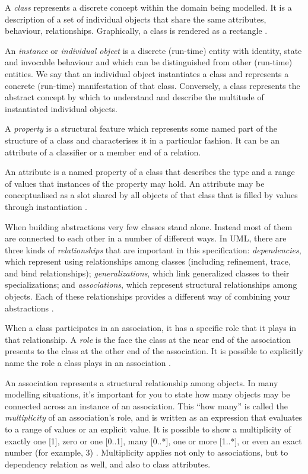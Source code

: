 	A \textit{class} represents a discrete concept within the domain being modelled. It is a description of a set of individual objects that share the same attributes, behaviour, relationships. Graphically, a class is rendered as a rectangle \cite{uml-userguide}.
	
	An \textit{instance} or \textit{individual object} is a discrete (run-time) entity with identity, state and invocable behaviour and which can be distinguished from other (run-time) entities. We say that an individual object instantiates a class and represents a concrete (run-time) manifestation of that class. Conversely, a class represents the abstract concept by which to understand and describe the multitude of instantiated individual objects. 
	
	A \textit{property} is a structural feature which represents some named part of the structure of a class and characterises it in a particular fashion. It can be an attribute of a classifier or a member end of a relation.
	
	An attribute is a named property of a class that describes the type and a range of values that instances of the property may hold. An attribute may be conceptualised as a slot  shared by all objects of that class that is filled by values through instantiation \cite{uml-userguide}.
	
	When building abstractions very few classes stand alone. Instead most of them are connected to each other in a number of different ways. In UML, there are three kinds of \textit{relationships} that are important in this specification: \textit{dependencies}, which represent using relationships among classes (including refinement, trace, and bind relationships); \textit{generalizations}, which link generalized classes to their specializations; and \textit{associations}, which represent structural relationships among objects. Each of these relationships provides a different way of combining your abstractions \cite{uml-userguide}.
	
	When a class participates in an association, it has a specific role that it plays in that relationship. A \textit{role} is the face the class at the near end of the association presents to the class at the other end of the association. It is possible to explicitly name the role a class plays in an association \cite{uml-userguide}.  
	
	An association represents a structural relationship among objects. In many modelling situations, it's important for you to state how many objects may be connected across an instance of an association. This ``how many'' is called the \textit{multiplicity} of an association's role, and is written as an expression that evaluates to a range of values or an explicit value. It is possible to show a multiplicity of exactly one [1], zero or one [0..1], many [0..*], one or more [1..*], or even an exact number (for example, 3) \cite{uml-userguide}. Multiplicity applies not only to associations, but to dependency relation as well, and also to class attributes.
	
